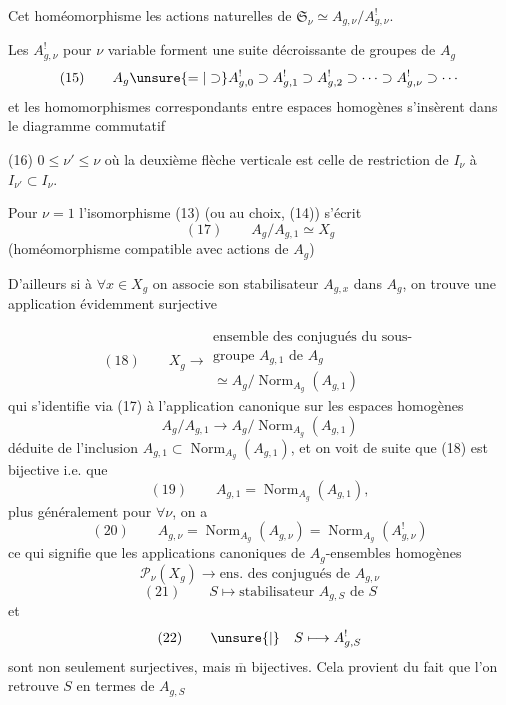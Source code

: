 Cet homéomorphisme  les actions
naturelles de $\mathfrak S_\nu\simeq A_{g,\nu}/A_{g,\nu}^!$.

Les $A_{g,\nu}^!$ pour $\nu$ variable forment une
suite décroissante de groupes de $A_g$
\[
(15)\qquad A_g\unsure{=|\supset}A_{g,0}^!\supset A_{g,1}^!\supset A_{g,2}^!
\supset\cdots\supset A_{g,\nu}^!\supset\cdots
\]
et les homomorphismes correspondants
entre espaces homogènes  s'insèrent dans le
diagramme commutatif  

(16)\quad
{}
\quad $0\leq\nu'\leq\nu$
où la deuxième flèche verticale est celle de
restriction de $I_\nu$ à $I_{\nu'}\subset I_\nu$.

Pour $\nu=1$  l'isomorphisme (13) (ou au choix,
(14)) s'écrit
\[
(17)\qquad A_g/A_{g,1}\simeq X_g
\]
(homéomorphisme compatible avec  actions de $A_g$)

D'ailleurs si à $\forall x\in X_g$ on associe son
stabilisateur $A_{g,x}$ dans $A_g$, on trouve une
application évidemment surjective

\[
(18)\qquad X_g\longrightarrow
\begin{gathered}
\text{ensemble des conjugués du sous-}\\
\text{groupe }A_{g,1}\text{ de }A_g\\
\simeq A_g/\operatorname{Norm}_{A_g}(A_{g,1})
\end{gathered}
\]
qui s'identifie via (17) à l'application canonique
sur les espaces homogènes
\[
 A_g/A_{g,1}\longrightarrow A_g/\operatorname{Norm}_{A_g}(A_{g,1})
\]
déduite de l'inclusion $A_{g,1}\subset\operatorname{Norm}_{A_g}(A_{g,1})$,
et on voit de suite que (18) est
bijective i.e. que 
\[
(19)\qquad A_{g,1}=\operatorname{Norm}_{A_g}(A_{g,1}),
\]
plus généralement pour $\forall\nu$, on a
\[
(20)\qquad A_{g,\nu}=\operatorname{Norm}_{A_g}(A_{g,\nu})
=\operatorname{Norm}_{A_g}(A_{g,\nu}^!)
\]
ce qui signifie que les applications canoniques
de $A_g$-ensembles homogènes
\[
\mathcal P_\nu(X_g)\longrightarrow\text{ens. des conjugués de }A_{g,\nu}
\]
\[
(21)\qquad S\longmapsto\text{stabilisateur }A_{g,S}\text{ de }S
\]
et
\[
(22)\qquad\unsure{\vert}\quad S\longmapsto A_{g,S}^!
\]
sont non seulement surjectives, mais $\overline{\mathrm m}$ bijectives.
Cela provient du fait que l'on retrouve
$S$ en termes de $A_{g,S}$\deleted{${}^!$} 
  

